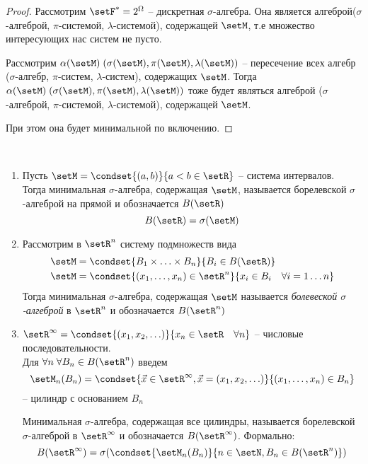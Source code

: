 \begin{proof}
	Рассмотрим $\setF^* = 2^{\Omega}$ -- дискретная $\sigma$-алгебра. 
	Она является алгеброй($\sigma$-алгеброй, $\pi$-системой, $\lambda$-системой), 
	содержащей $\setM$, т.е множество интересующих нас систем не пусто.
	
	Рассмотрим $\alpha(\setM)\; (\sigma(\setM), \pi(\setM), \lambda(\setM))$ 
	-- пересечение всех алгебр ($\sigma$-алгебр, $\pi$-систем, $\lambda$-систем), содержащих $\setM$. 
	Тогда $\alpha(\setM)\; (\sigma(\setM), \pi(\setM), \lambda(\setM))$ тоже будет являться алгеброй 
	($\sigma$-алгеброй, $\pi$-системой, $\lambda$-системой), содержащей $\setM$.

	При этом она будет минимальной по включению.
\end{proof}

\begin{example}~

	\begin{enumerate}
		\item 
			Пусть $\setM = \condset{(a, b)}{a < b \in \setR}$ -- система интервалов.\\
			Тогда минимальная $\sigma$-алгебра, содержащая $\setM$, 
			называется борелевской $\sigma$-алгеброй на прямой и обозначается $B(\setR)$\\
			\begin{equation*}
				B(\setR) = \sigma(\setM)
			\end{equation*}
				
		\item 
			Рассмотрим в $\setR^n$ систему подмножеств вида
			\begin{align*}
				&\setM = \condset{B_1 \times \ldots \times B_n}{B_i \in B(\setR)}\\
				&\setM = \condset{(x_1, \ldots, x_n) \in \setR^n}{x_i \in B_i \quad \forall i = 1 \ldots n}
			\end{align*}
			Тогда минимальная $\sigma$-алгебра, содержащая $\setM$ называется 
			\emph{болевеской $\sigma$-алгеброй} в $\setR^n$  и обозначается $B(\setR^n)$
			 
		\item 
			$\setR^{\infty} = \condset{ (x_1, x_2, \ldots )}{x_n \in \setR \quad \forall n }$ 
			-- числовые последовательности.\\
			Для $\forall n\; \forall B_n \in B(\setR^n)$ введем
			\begin{equation*}
				\setM_n(B_n) = \condset{\vec{x} \in \setR^{\infty}, \vec{x} = (x_1, x_2, \ldots )}
														{(x_1, \ldots, x_n) \in B_n}
			\end{equation*} -- цилиндр с основанием $B_n$
		
		Минимальная $\sigma$-алгебра, содержащая все цилиндры, называется борелевской 
		$\sigma$-алгеброй в $\setR^{\infty}$ и обозначается $B(\setR^{\infty})$. Формально:
		\begin{equation*}
			B(\setR^{\infty}) = \sigma(\condset{\setM_n(B_n)}{n \in \setN, B_n \in B(\setR^n)})
		\end{equation*}
	\end{enumerate}
\end{example}

